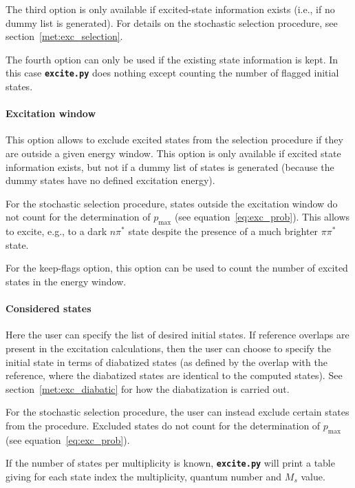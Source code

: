 \documentclass[a4paper,10pt,DIV=15,openany]{scrbook}
\newcommand{\ttt}[1]{\textbf{\texttt{#1}}}
\begin{document}
The third option is only available if excited-state information exists (i.e., if no dummy list is generated). For details on the stochastic selection procedure, see section~\ref{met:exc_selection}. 

The fourth option can only be used if the existing state information is kept. In this case \ttt{excite.py} does nothing except counting the number of flagged initial states.

\paragraph{Excitation window}

This option allows to exclude excited states from the selection procedure if they are outside a given energy window. This option is only available if excited state information exists, but not if a dummy list of states is generated (because the dummy states have no defined excitation energy).

For the stochastic selection procedure, states outside the excitation window do not count for the determination of $p_\text{max}$ (see equation~\eqref{eq:exc_prob}). This allows to excite, e.g., to a dark $n\pi^*$ state despite the presence of a much brighter $\pi\pi^*$ state.

For the keep-flags option, this option can be used to count the number of excited states in the energy window.

\paragraph{Considered states}

Here the user can specify the list of desired initial states. 
If reference overlaps are present in the excitation calculations, then the user can choose to specify the initial state in terms of diabatized states (as defined by the overlap with the reference, where the diabatized states are identical to the computed states).
See section~\ref{met:exc_diabatic} for how the diabatization is carried out.

For the stochastic selection procedure, the user can instead exclude certain states from the procedure. Excluded states do not count for the determination of $p_\text{max}$ (see equation~\eqref{eq:exc_prob}).

If the number of states per multiplicity is known, \ttt{excite.py} will print a table giving for each state index the multiplicity, quantum number and $M_s$ value.
\end{document}
